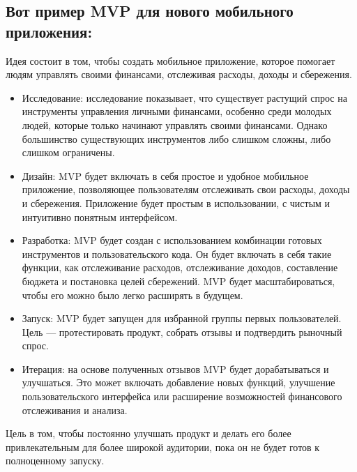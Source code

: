 \documentclass[letterpaper,10pt,russian]{sphinxmanual}
\begin{document}
\subsection{Вот пример MVP для нового мобильного приложения:}
\label{\detokenize{educational_materials/mvp/content:id6}}
\sphinxAtStartPar
Идея состоит в том, чтобы создать мобильное приложение, которое помогает людям управлять своими финансами, отслеживая расходы, доходы и сбережения.
\begin{itemize}
\item {} 
\sphinxAtStartPar
Исследование: исследование показывает, что существует растущий спрос на инструменты управления личными финансами, особенно среди молодых людей, которые только начинают управлять своими финансами. Однако большинство существующих инструментов либо слишком сложны, либо слишком ограничены.

\item {} 
\sphinxAtStartPar
Дизайн: MVP будет включать в себя простое и удобное мобильное приложение, позволяющее пользователям отслеживать свои расходы, доходы и сбережения. Приложение будет простым в использовании, с чистым и интуитивно понятным интерфейсом.

\item {} 
\sphinxAtStartPar
Разработка: MVP будет создан с использованием комбинации готовых инструментов и пользовательского кода. Он будет включать в себя такие функции, как отслеживание расходов, отслеживание доходов, составление бюджета и постановка целей сбережений. MVP будет масштабироваться, чтобы его можно было легко расширять в будущем.

\item {} 
\sphinxAtStartPar
Запуск: MVP будет запущен для избранной группы первых пользователей. Цель — протестировать продукт, собрать отзывы и подтвердить рыночный спрос.

\item {} 
\sphinxAtStartPar
Итерация: на основе полученных отзывов MVP будет дорабатываться и улучшаться. Это может включать добавление новых функций, улучшение пользовательского интерфейса или расширение возможностей финансового отслеживания и анализа.

\end{itemize}

\sphinxAtStartPar
Цель в том, чтобы постоянно улучшать продукт и делать его более привлекательным для более широкой аудитории, пока он не будет готов к полноценному запуску.
\end{document}
